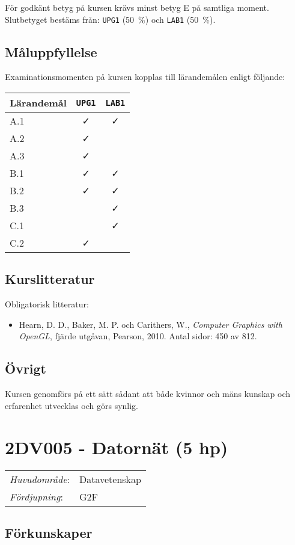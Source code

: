 För godkänt betyg på kursen krävs minst betyg E på samtliga moment.
Slutbetyget bestäms från: \texttt{UPG1} (50~\%) och \texttt{LAB1} (50~\%).

\subsection*{Måluppfyllelse}

Examinationsmomenten på kursen kopplas till lärandemålen enligt
följande:

\begin{longtable}[]{@{}lcc@{}}
\toprule
\textsf{Lärandemål} & \texttt{UPG1} & \texttt{LAB1}\tabularnewline
\midrule
\endhead
A.1 & \faCheck & \faCheck\tabularnewline
A.2 & \faCheck &\tabularnewline
A.3 & \faCheck &\tabularnewline
B.1 & \faCheck & \faCheck\tabularnewline
B.2 & \faCheck & \faCheck\tabularnewline
B.3 & & \faCheck\tabularnewline
C.1 & & \faCheck\tabularnewline
C.2 & \faCheck &\tabularnewline
\bottomrule
\end{longtable}

\subsection*{Kurslitteratur}

Obligatorisk litteratur:

\begin{itemize}
\tightlist
\item
  Hearn, D. D., Baker, M. P. och Carithers, W., \emph{Computer Graphics
  with OpenGL}, fjärde utgåvan, Pearson, 2010. Antal sidor: 450 av 812.
\end{itemize}

\subsection*{Övrigt}

Kursen genomförs på ett sätt sådant att både kvinnor och mäns kunskap och erfarenhet utvecklas och görs synlig.
\pagebreak
\section*{2DV005 - Datornät (5 hp)}

\begin{tabular}{ll}\emph{Huvudområde}: & Datavetenskap\tabularnewline\emph{Fördjupning}: & G2F\tabularnewline\end{tabular}

\subsection*{Förkunskaper}

